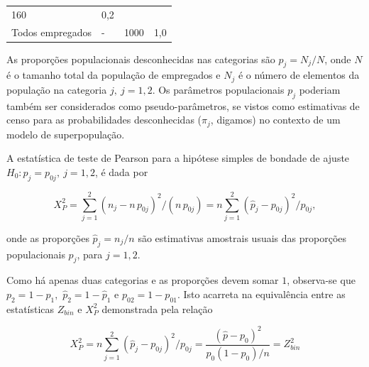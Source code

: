 \documentclass[]{book}
\theoremstyle{definition}
\theoremstyle{definition}
\theoremstyle{definition}
\theoremstyle{remark}
\begin{document}
\begin{longtable}[]{@{}llll@{}}
\begin{minipage}[t]{0.07\columnwidth}
160\strut
\end{minipage} & \begin{minipage}[t]{0.11\columnwidth}\raggedright\strut
0,2\strut
\end{minipage}\tabularnewline
\begin{minipage}[t]{0.23\columnwidth}\raggedright\strut
Todos empregados\strut
\end{minipage} & \begin{minipage}[t]{0.05\columnwidth}\raggedright\strut
-\strut
\end{minipage} & \begin{minipage}[t]{0.07\columnwidth}\raggedright\strut
1000\strut
\end{minipage} & \begin{minipage}[t]{0.11\columnwidth}\raggedright\strut
1,0\strut
\end{minipage}\tabularnewline
\bottomrule
\end{longtable}

As proporções populacionais desconhecidas nas categorias são
\(p_{j}=N_{j}/N\), onde \(N\) é o tamanho total da população de
empregados e \(N_{j}\) é o número de elementos da população na categoria
\(j,\ j=1,2\). Os parâmetros populacionais \(p_{j}\) poderiam também ser
considerados como pseudo-parâmetros, se vistos como estimativas de censo
para as probabilidades desconhecidas (\(\pi _{j}\), digamos) no contexto
de um modelo de superpopulação.

A estatística de teste de Pearson para a hipótese simples de bondade de
ajuste \(H_{0}:p_{j}=p_{0j},\ j=1,2\), é dada por

\begin{equation}
X_{P}^{2}=\sum\limits_{j=1}^{2}\left( n_{j}-n\,p_{0j}\right)
^{2}/\left( n\,p_{0j}\right) =n\sum\limits_{j=1}^{2}\left( 
\widehat{p}_{j}-p_{0j}\right) ^{2}/p_{0j},  
\label{eq:qual1}
\end{equation}

onde as proporções \(\widehat{p}_{j}=n_{j}/n\) são estimativas amostrais
usuais das proporções populacionais \(p_{j}\), para \(j=1,2\).

Como há apenas duas categorias e as proporções devem somar \(1\),
observa-se que \(p_{2}=1-p_{1},\) \(\widehat{p}_{2}=1-\widehat{p}_{1}\)
e \(p_{02}=1-p_{01}\). Isto acarreta na equivalência entre as
estatísticas \(Z_{bin}\) e \(X_{P}^{2}\) demonstrada pela relação

\begin{equation}
X_{P}^{2}=n\sum\limits_{j=1}^{2}\left( \widehat{p}
_{j}-p_{0j}\right) ^{2}/p_{0j}=\frac{\left( \widehat{p}-p_{0}\right) ^{2}}{
p_{0}\left( 1-p_{0}\right) /n}=Z_{bin}^{2}  
\label{eq:qual2}
\end{equation}
\end{document}
